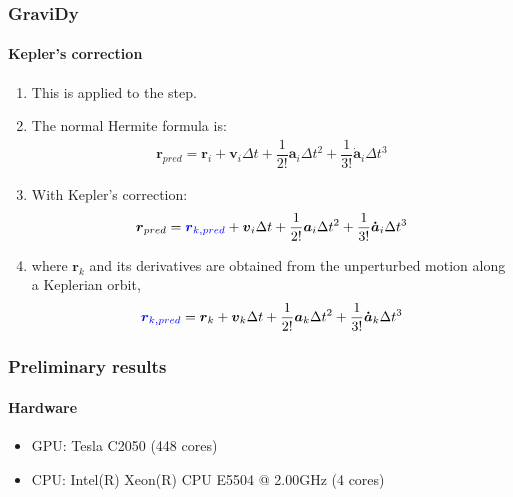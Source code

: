 \begin{frame}
    \frametitle{GraviDy}
    \framesubtitle{Kepler's correction}
    \begin{enumerate}
        \item This is applied to the  step.
        \item The normal Hermite formula is:
        \begin{eqnarray}
            \boldsymbol{r}_{pred} =    \boldsymbol{      r}_{i}              +
                                       \boldsymbol{      v}_{i} \Delta t     +
                         \dfrac{1}{2!} \boldsymbol{      a}_{i} \Delta t^{2} +
                         \dfrac{1}{3!} \boldsymbol{\dot{a}}_{i} \Delta t^{3}
        \end{eqnarray}
        \item With Kepler's correction:
        \begin{eqnarray}
            \boldsymbol{r}_{pred} =    \textcolor{blue}{\boldsymbol{      r}_{k,pred}}         +
                                             \boldsymbol{      v}_{i} \Delta t     +
                         \dfrac{1}{2!}       \boldsymbol{      a}_{i} \Delta t^{2} +
                         \dfrac{1}{3!}       \boldsymbol{\dot{a}}_{i} \Delta t^{3}
        \end{eqnarray}
        \item where $\boldsymbol{r}_{k}$ and its derivatives 
            are obtained from the unperturbed motion along a Keplerian orbit,
        \begin{eqnarray}
            \textcolor{blue}{\boldsymbol{r}_{k,pred}} =  \boldsymbol{      r}_{k}              +
                                       \boldsymbol{      v}_{k} \Delta t     +
                         \dfrac{1}{2!} \boldsymbol{      a}_{k} \Delta t^{2} +
                         \dfrac{1}{3!} \boldsymbol{\dot{a}}_{k} \Delta t^{3}
        \end{eqnarray}

    \end{enumerate}
\end{frame}

\begin{frame}
    \frametitle{Preliminary results}
    \framesubtitle{Hardware}
    \begin{itemize}
        \item GPU: Tesla C2050 (448 cores)
        \item CPU: Intel(R) Xeon(R) CPU E5504  @ 2.00GHz (4 cores)

    \end{itemize}
\end{frame}

